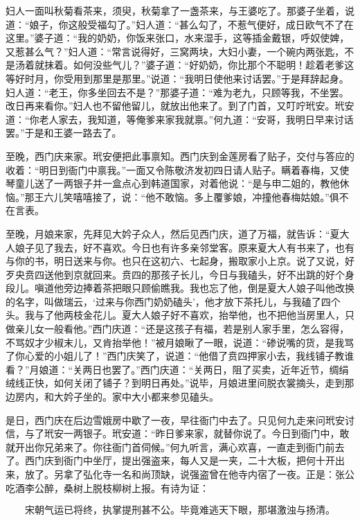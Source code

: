 妇人一面叫秋菊看茶来，须臾，秋菊拿了一盏茶来，与王婆吃了。那婆子坐着，说道：“娘子，你这般受福勾了。”妇人道：“甚么勾了，不惹气便好，成日欧气不了在这里。”婆子道：“我的奶奶，你饭来张口，水来湿手，这等插金戴银，呼奴使婢，又惹甚么气？”妇人道：“常言说得好，三窝两块，大妇小妻，一个碗内两张匙，不是汤着就抹着。如何没些气儿？”婆子道：“好奶奶，你比那个不聪明！趁着老爹这等好时月，你受用到那里是那里。”说道：“我明日使他来讨话罢。”于是拜辞起身。妇人道：“老王，你多坐回去不是？”那婆子道：“难为老九，只顾等我，不坐罢。改日再来看你。”妇人也不留他留儿，就放出他来了。到了门首，又叮咛玳安。玳安道：“你老人家去，我知道，等俺爹来家我就禀。”何九道：“安哥，我明日早来讨话罢。”于是和王婆一路去了。

至晚，西门庆来家。玳安便把此事禀知。西门庆到金莲房看了贴子，交付与答应的收着：“明日到衙门中禀我。”一面又令陈敬济发初四日请人贴子。瞒着春梅，又使琴童儿送了一两银子并一盒点心到韩道国家，对着他说：“是与申二姐的，教他休恼。”那王六儿笑嘻嘻接了，说：“他不敢恼。多上覆爹娘，冲撞他春梅姑娘。”俱不在言表。

至晚，月娘来家，先拜见大妗子众人，然后见西门庆，道了万福，就告诉：“夏大人娘子见了我去，好不喜欢。今日也有许多亲邻堂客。原来夏大人有书来了，也有与你的书，明日送来与你。也只在这初六、七起身，搬取家小上京。说了又说，好歹央贲四送他到京就回来。贲四的那孩子长儿，今日与我磕头，好不出跳的好个身段儿。嗔道他旁边捧着茶把眼只顾偷瞧我。我也忘了他，倒是夏大人娘子叫他改换的名字，叫做瑞云，‘过来与你西门奶奶磕头’，他才放下茶托儿，与我磕了四个头。我与了他两枝金花儿。夏大人娘子好不喜欢，抬举他，也不把他当房里人，只做亲儿女一般看他。”西门庆道：“还是这孩子有福，若是别人家手里，怎么容得，不骂奴才少椒末儿，又肯抬举他！”被月娘瞅了一眼，说道：“碜说嘴的货，是我骂了你心爱的小姐儿了！”西门庆笑了，说道：“他借了贲四押家小去，我线铺子教谁看？”月娘道：“关两日也罢了。”西门庆道：“关两日，阻了买卖，近年近节，绸绢绒线正快，如何关闭了铺子？到明日再处。”说毕，月娘进里间脱衣裳摘头，走到那边房内，和大妗子坐的。家中大小都来参见磕头。

是日，西门庆在后边雪娥房中歇了一夜，早往衙门中去了。只见何九走来问玳安讨信，与了玳安一两银子。玳安道：“昨日爹来家，就替你说了。今日到衙门中，敢就开出你兄弟来了。你往衙门首伺候。”何九听言，满心欢喜，一直走到衙门前去了。西门庆到衙门中坐厅，提出强盗来，每人又是一夹，二十大板，把何十开出来，放了。另拿了弘化寺一名和尚顶缺，说强盗曾在他寺内宿了一夜。正是：张公吃酒李公醉，桑树上脱枝柳树上报。有诗为证：

\[
宋朝气运已将终，执掌提刑甚不公。
毕竟难逃天下眼，那堪激浊与扬清。
\]

